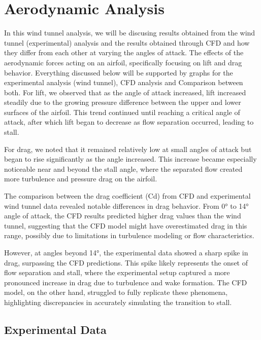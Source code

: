 \chapter{Aerodynamic Analysis}  \label{cp:aero}



In this wind tunnel analysis, we will be discusing results obtained from the wind tunnel (experimental) analysis and the results obtained through CFD and how they differ from each other at varying the angles of attack.
The effects of the aerodynamic forces acting on an airfoil, specifically focusing on lift and drag behavior. Everything discussed below will be supported by graphs for the experimental analysis (wind tunnel), CFD analysis and Comparison between both. 
For lift, we observed that as the angle of attack increased, lift increased steadily due to the growing pressure difference between the upper and lower surfaces of the airfoil. This trend continued until reaching a critical angle of attack, after which lift began to decrease as flow separation occurred, leading to stall.

For drag, we noted that it remained relatively low at small angles of attack but began to rise significantly as the angle increased. This increase became especially noticeable near and beyond the stall angle, where the separated flow created more turbulence and pressure drag on the airfoil.

The comparison between the drag coefficient (Cd) from CFD and experimental wind tunnel data revealed notable differences in drag behavior. From 0° to 14° angle of attack, the CFD results predicted higher drag values than the wind tunnel, suggesting that the CFD model might have overestimated drag in this range, possibly due to limitations in turbulence modeling or flow characteristics.

However, at angles beyond 14°, the experimental data showed a sharp spike in drag, surpassing the CFD predictions. This spike likely represents the onset of flow separation and stall, where the experimental setup captured a more pronounced increase in drag due to turbulence and wake formation. The CFD model, on the other hand, struggled to fully replicate these phenomena, highlighting discrepancies in accurately simulating the transition to stall.

\newpage

\section{Experimental Data}

